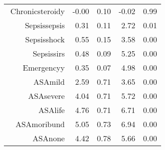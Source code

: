 \begin{tabular}{rrrrr}
$$  Chronic\-steroid\-y & -0.00 & 0.10 & -0.02 & 0.99 \\ 
  Sepsis\-sepsis & 0.31 & 0.11 & 2.72 & 0.01 \\ 
  Sepsis\-shock & 0.55 & 0.15 & 3.58 & 0.00 \\ 
  Sepsis\-sirs & 0.48 & 0.09 & 5.25 & 0.00 \\ 
  Emergency\-y & 0.35 & 0.07 & 4.98 & 0.00 \\ 
  ASA\-mild & 2.59 & 0.71 & 3.65 & 0.00 \\ 
  ASA\-severe & 4.04 & 0.71 & 5.72 & 0.00 \\ 
  ASA\-life & 4.76 & 0.71 & 6.71 & 0.00 \\ 
  ASA\-moribund & 5.05 & 0.73 & 6.94 & 0.00 \\ 
  ASA\-none & 4.42 & 0.78 & 5.66 & 0.00 \\ 
   \hline
\end{tabular}

